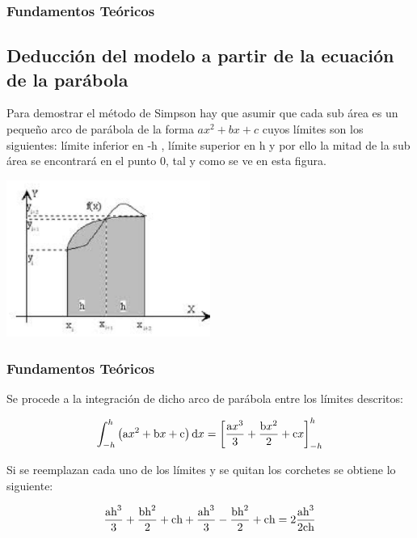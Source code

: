 \documentclass{beamer}
\begin{document}
\begin{frame}
\frametitle{Fundamentos Teóricos}
\subsection{Deducción del modelo a partir de la ecuación de la parábola}
Para demostrar el método de Simpson hay que asumir que cada sub área es un pequeño arco de parábola de la forma $ ax^2 + bx + c $ cuyos límites son los siguientes: límite inferior en -h , límite superior en h y por ello la mitad de la sub área se encontrará en el punto 0, tal y como se ve en esta figura.
	
\begin{center}
\includegraphics[width=0.5\textwidth]{img/ima2.eps}
\end{center}	
	

\end{frame}
\begin{frame}
\frametitle{Fundamentos Teóricos}
		Se procede a la integración de dicho arco de parábola entre los límites descritos:
		
		\[ \int_{-h}^{h}\left(\textup{a}x^2 + \textup{b}x + \textup{c}\right)\textup{d}x=\left[\frac{\textup{a}x^{3}}
		{3}+\frac{\textup{b}x^{2}}{2}+\textup{c}x\right]_{-h}^{h} \] 
	
		Si se reemplazan cada uno de los límites y se quitan los corchetes se obtiene lo siguiente:
		
		\[\frac{\textup{a}\textup{h}^3}{3} + \frac{\textup{b}\textup{h}^2}{2} + \textup{c}\textup{h} + \frac{\textup{a}\textup{h}^3}{3} 
		-  \frac{\textup{b}\textup{h}^2}{2} + \textup{c}\textup{h}=2\frac{\textup{a}\textup{h}^3}{2\textup{c}\textup{h}}\]

\end{frame}
\end{document}
